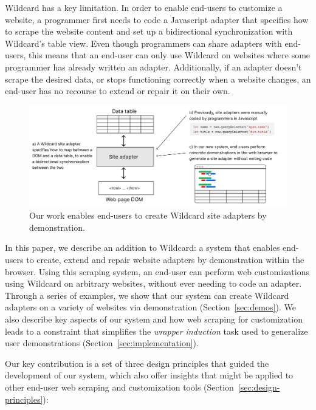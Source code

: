 \documentclass[sigconf,10pt]{acmart}
\begin{document}
Wildcard has a key limitation. In order to enable end-users to customize
a website, a programmer first needs to code a Javascript adapter that
specifies how to scrape the website content and set up a bidirectional
synchronization with Wildcard's table view. Even though programmers can
share adapters with end-users, this means that an end-user can only use
Wildcard on websites where some programmer has already written an
adapter. Additionally, if an adapter doesn't scrape the desired data, or
stops functioning correctly when a website changes, an end-user has no
recourse to extend or repair it on their own.

\begin{figure}
  \includegraphics[width=\textwidth]{media/overview.png}
  \caption{\label{fig:overview}Our work enables end-users to create Wildcard site adapters by demonstration.}
\end{figure}

In this paper, we describe an addition to Wildcard: a system that
enables end-users to create, extend and repair website adapters by
demonstration within the browser. Using this scraping system, an
end-user can perform web customizations using Wildcard on arbitrary
websites, without ever needing to code an adapter. Through a series of
examples, we show that our system can create Wildcard adapters on a
variety of websites via demonstration (Section~\ref{sec:demos}). We also
describe key aspects of our system and how web scraping for
customization leads to a constraint that simplifies the \emph{wrapper
induction} \citep{kushmerick2000} task used to generalize user
demonstrations (Section~\ref{sec:implementation}).

Our key contribution is a set of three design principles that guided the
development of our system, which also offer insights that might be
applied to other end-user web scraping and customization tools
(Section~\ref{sec:design-principles}):
\end{document}
